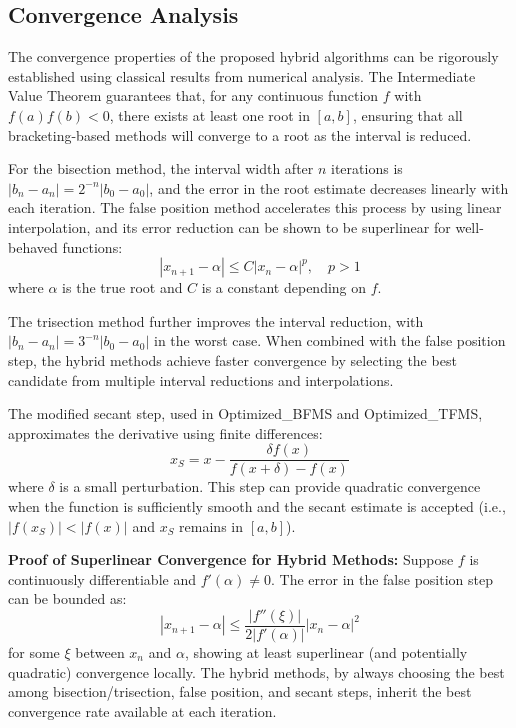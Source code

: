 \documentclass[amsmath, amssymb, aps]{revtex4-2}
\begin{document}
\subsection{Convergence Analysis}
The convergence properties of the proposed hybrid algorithms can be rigorously established using classical results from numerical analysis. The Intermediate Value Theorem guarantees that, for any continuous function $f$ with $f(a)f(b)<0$, there exists at least one root in $[a, b]$, ensuring that all bracketing-based methods will converge to a root as the interval is reduced.

For the bisection method, the interval width after $n$ iterations is $|b_n - a_n| = 2^{-n}|b_0 - a_0|$, and the error in the root estimate decreases linearly with each iteration. The false position method accelerates this process by using linear interpolation, and its error reduction can be shown to be superlinear for well-behaved functions:
\begin{equation}
|x_{n+1} - \alpha| \leq C |x_n - \alpha|^p, \quad p > 1
\end{equation}
where $\alpha$ is the true root and $C$ is a constant depending on $f$.

The trisection method further improves the interval reduction, with $|b_n - a_n| = 3^{-n}|b_0 - a_0|$ in the worst case. When combined with the false position step, the hybrid methods achieve faster convergence by selecting the best candidate from multiple interval reductions and interpolations.

The modified secant step, used in Optimized\_BFMS and Optimized\_TFMS, approximates the derivative using finite differences:
\begin{equation}
x_{S} = x - \frac{\delta f(x)}{f(x+\delta) - f(x)}
\end{equation}
where $\delta$ is a small perturbation. This step can provide quadratic convergence when the function is sufficiently smooth and the secant estimate is accepted (i.e., $|f(x_S)| < |f(x)|$ and $x_S$ remains in $[a, b]$).

\textbf{Proof of Superlinear Convergence for Hybrid Methods:}
Suppose $f$ is continuously differentiable and $f'(\alpha) \neq 0$. The error in the false position step can be bounded as:
\begin{equation}
|x_{n+1} - \alpha| \leq \frac{|f''(\xi)|}{2|f'(\alpha)|} |x_n - \alpha|^2
\end{equation}
for some $\xi$ between $x_n$ and $\alpha$, showing at least superlinear (and potentially quadratic) convergence locally. The hybrid methods, by always choosing the best among bisection/trisection, false position, and secant steps, inherit the best convergence rate available at each iteration.
\end{document}
